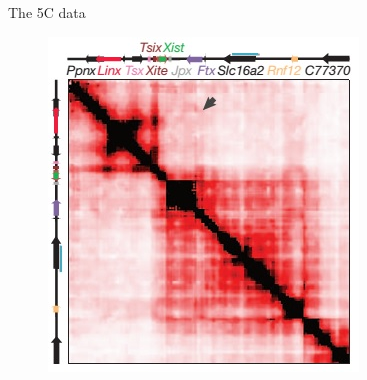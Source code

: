 \documentclass[8pt]{beamer}
\begin{document}
\begin{frame}{The 5C data}
\begin{figure}[H]
\includegraphics[scale=0.3]{tadDandENoraEtAl2012}

\end{figure}

\end{frame}
\end{document}

